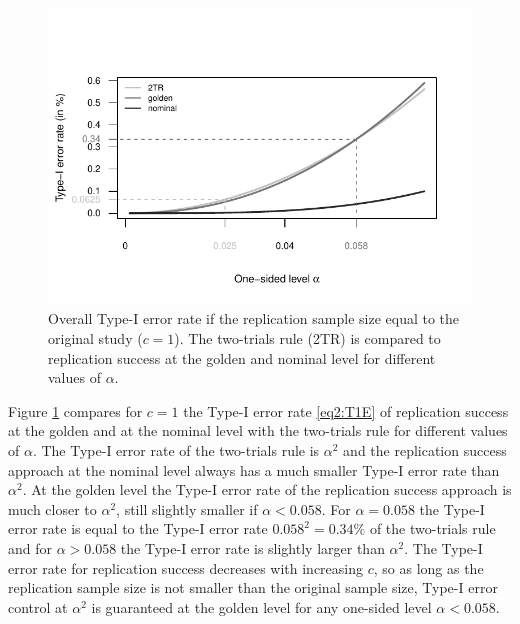 \begin{figure}[!ht]
\begin{center}

\begin{knitrout}
\color{fgcolor}

{\centering \includegraphics[width=\maxwidth]{images/paper2/fig5-1}

}


\end{knitrout}

\end{center}
\caption{Overall Type-I error rate if the replication sample size equal to the
  original study ($c=1$). The two-trials rule (2TR) is compared to replication
  success at the golden and nominal level for different values of $\alpha$.}
\label{fig2:fig5}
\end{figure}

Figure \ref{fig2:fig5} compares for $c=1$ the Type-I error rate \eqref{eq2:T1E} of
replication success at the golden and at the nominal level with the two-trials
rule for different values of $\alpha$. The Type-I error rate of the two-trials
rule is $\alpha^2$ and the replication success approach at the nominal level
always has a much smaller Type-I error rate than $\alpha^2$. At the golden level
the Type-I error rate of the replication success approach is much closer to
$\alpha^2$, still slightly smaller if $\alpha < 0.058$. For $\alpha = 0.058$ the
Type-I error rate is equal to the Type-I error rate $0.058^2 = 0.34\%$ of the
two-trials rule and for $\alpha > 0.058$ the Type-I error rate is slightly
larger than $\alpha^2$. The Type-I error rate for replication success decreases
with increasing $c$, so as long as the replication sample size is not smaller
than the original sample size, Type-I error control at $\alpha^2$ is guaranteed
at the golden level for any one-sided level $\alpha < 0.058$.

